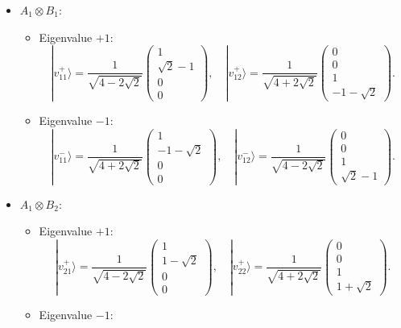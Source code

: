 \documentclass{article}
\begin{document}
\begin{itemize}
    \item \( A_1 \otimes B_1 \):
    \begin{itemize}
        \item Eigenvalue \( +1 \):
        \[
        |v_{11}^+\rangle = \frac{1}{\sqrt{4-2\sqrt{2}}} \begin{pmatrix} 1 \\ \sqrt{2}-1 \\ 0 \\ 0 \end{pmatrix}, \quad |v_{12}^+\rangle = \frac{1}{\sqrt{4+2\sqrt{2}}} \begin{pmatrix} 0 \\ 0 \\ 1 \\ -1-\sqrt{2} \end{pmatrix}.
        \]
        \item Eigenvalue \( -1 \):
        \[
        |v_{11}^-\rangle = \frac{1}{\sqrt{4+2\sqrt{2}}} \begin{pmatrix} 1 \\ -1-\sqrt{2} \\ 0 \\ 0 \end{pmatrix}, \quad |v_{12}^-\rangle = \frac{1}{\sqrt{4-2\sqrt{2}}} \begin{pmatrix} 0 \\ 0 \\ 1 \\ \sqrt{2}-1 \end{pmatrix}.
        \]
    \end{itemize}
    \item \( A_1 \otimes B_2 \):
    \begin{itemize}
        \item Eigenvalue \( +1 \):
        \[
        |v_{21}^+\rangle = \frac{1}{\sqrt{4-2\sqrt{2}}} \begin{pmatrix} 1 \\ 1-\sqrt{2} \\ 0 \\ 0 \end{pmatrix}, \quad |v_{22}^+\rangle = \frac{1}{\sqrt{4+2\sqrt{2}}} \begin{pmatrix} 0 \\ 0 \\ 1 \\ 1+\sqrt{2} \end{pmatrix}.
        \]
        \item Eigenvalue \( -1 \):

\end{itemize}
\end{itemize}
\end{document}
